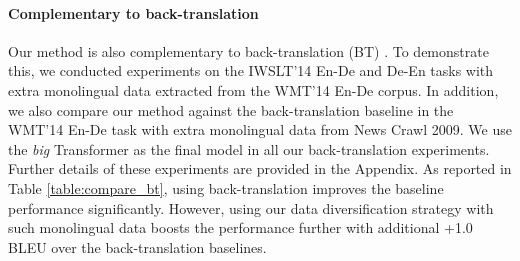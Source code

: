\documentclass{article}
\begin{document}
\begin{figure}[t!]
\vspace{-1em}
\begin{minipage}[t]{0.45\textwidth}
\centering
{}
\label{table:ablation_n}
\vspace{-0.5em}
\end{minipage}
\hfill
\begin{minipage}[t]{0.51\textwidth}
\centering
{}
\label{table:ablation_k}
\vspace{-0.5em}
\end{minipage}
\end{figure}



\paragraph{Complementary to back-translation}


Our method is also complementary to back-translation (BT) \citep{backtranslate_sennrich-etal-2016-improving}. To demonstrate this, we conducted experiments on the IWSLT'14 En-De and De-En tasks with extra monolingual data extracted from the WMT'14 En-De corpus. In addition, we also compare our method against the back-translation baseline in the WMT'14 En-De task with extra monolingual data from News Crawl 2009. We use the \textit{big} Transformer as the final model in all our back-translation experiments. Further details of these experiments are provided in the Appendix. As reported in Table \ref{table:compare_bt}, using back-translation improves the baseline performance significantly. However, using our data diversification strategy with such monolingual data boosts the performance further with additional +1.0 BLEU over the back-translation baselines.
\end{document}
